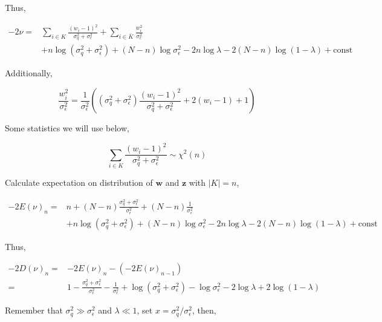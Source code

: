 Thus, 

\begin{equation}
\begin{aligned}
    -2\nu =& \sum_{i\in K}\frac{(w_i - 1)^2}{\sigma_q^2+\sigma_\epsilon^2} + \sum_{i\in \bar{K}}\frac{w_i^2}{\sigma_\epsilon^2} \\ 
    &+ n\log(\sigma_q^2+\sigma_\epsilon^2) + (N-n)\log\sigma_\epsilon^2 - 2n\log\lambda - 2(N-n)\log(1-\lambda) + \mathrm{const}
\end{aligned}
\end{equation}

Additionally, 

\begin{equation}
    \frac{w_i^2}{\sigma_\epsilon^2} = \frac{1}{\sigma_\epsilon^2}((\sigma_q^2+\sigma_\epsilon^2)\frac{(w_i - 1)^2}{\sigma_q^2+\sigma_\epsilon^2} + 2(w_i - 1) + 1)
\end{equation}

Some statistics we will use below,

\begin{equation}
    \sum_{i\in K}\frac{(w_i - 1)^2}{\sigma_q^2+\sigma_\epsilon^2} \sim \chi^2(n)
\end{equation}

Calculate expectation on distribution of $\bm{w}$ and $\bm{z}$ with $|K|=n$, 

\begin{equation}
\begin{aligned}
    -2E(\nu)_n =& n + (N - n)\frac{\sigma_q^2+\sigma_\epsilon^2}{\sigma_\epsilon^2} + (N - n)\frac{1}{\sigma_\epsilon^2} \\ 
    &+ n\log(\sigma_q^2+\sigma_\epsilon^2) + (N-n)\log\sigma_\epsilon^2 - 2n\log\lambda - 2(N-n)\log(1-\lambda) + \mathrm{const}
\end{aligned}
\end{equation}

Thus, 

\begin{equation}
\begin{aligned}
    -2D(\nu)_n =& -2E(\nu)_n - (-2E(\nu)_{n-1}) \\ 
    =& 1 - \frac{\sigma_q^2+\sigma_\epsilon^2}{\sigma_\epsilon^2} - \frac{1}{\sigma_\epsilon^2} + \log(\sigma_q^2+\sigma_\epsilon^2) - \log\sigma_\epsilon^2 - 2\log\lambda + 2\log(1-\lambda)
\end{aligned}
\end{equation}

Remember that $\sigma_q^2 \gg \sigma_\epsilon^2$ and $\lambda \ll 1$, set $x=\sigma_q^2/\sigma_\epsilon^2$, then,

